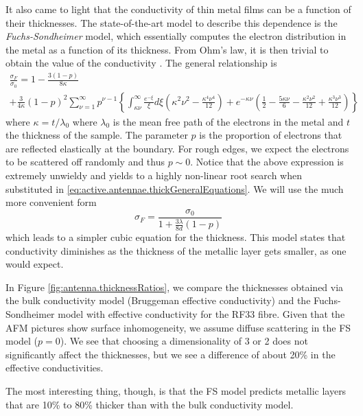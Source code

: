 It also came to light that the conductivity 
of thin metal films can be a function of their thicknesses. 
The state-of-the-art model to describe this dependence is the 
\textit{Fuchs-Sondheimer} model, which essentially computes the 
electron distribution in the metal as a function of its thickness. 
From Ohm's law, it is then trivial to obtain the value of the 
conductivity \cite{FUC1938,SON1952,PUR2007}. The general relationship
is
	\begin{multline}
		\frac{\sigma_F}{\sigma_0} = 
			1-\frac{3(1-p)}{8\kappa}\\+\frac{3}{4\kappa}\left(1-p\right)^2
			\sum_{\nu=1}^\infty p^{\nu-1}
			\left\{
				\int_{\kappa\nu}^\infty\frac{e^{-\xi}}{\xi}d\xi\left(\kappa^2\nu^2-\frac{\kappa^4\nu^4}{12}\right)
				+e^{-\kappa\nu}\left(\frac{1}{2}-\frac{5\kappa\nu}{6}-\frac{\kappa^2\nu^2}{12}+\frac{\kappa^3\nu^3}{12}\right)	
			\right\}
	\end{multline}
where $\kappa=t/\lambda_0$ where $\lambda_0$ is the mean free path of the electrons in the metal and
$t$ the thickness of the sample. The parameter $p$ is the proportion of electrons that are reflected
elastically at the boundary. For rough edges, we expect the electrons to be scattered off randomly 
and thus $p\sim0$. Notice that the above expression is extremely unwieldy and yields to a highly
non-linear root search when substituted in \eqref{eq:active.antennae.thickGeneralEquations}. 
We will use the much more convenient form 
  \begin{equation}
      \sigma_F = \frac{\sigma_0}{1+\frac{3\lambda}{8d}\left(1-p\right)}
  \end{equation}
which leads to a simpler cubic equation for the thickness.
This model states that conductivity
diminishes as the thickness of the metallic layer gets smaller, 
as one would expect.

In Figure \ref{fig:antenna.thicknessRatios}, we compare the 
thicknesses obtained via the bulk conductivity model (Bruggeman 
effective conductivity) and the Fuchs-Sondheimer model with 
effective conductivity for the RF33 fibre. Given that the AFM pictures
show surface inhomogeneity, we assume diffuse scattering in 
the FS model ($p=0$). We see that choosing a dimensionality 
of 3 or 2 does not significantly affect the thicknesses, but
we see a difference of about 20\% in the effective conductivities.

The most interesting thing, though, is that the FS
model predicts metallic layers that are 10\% to 80\% thicker 
than with the bulk conductivity model. 

